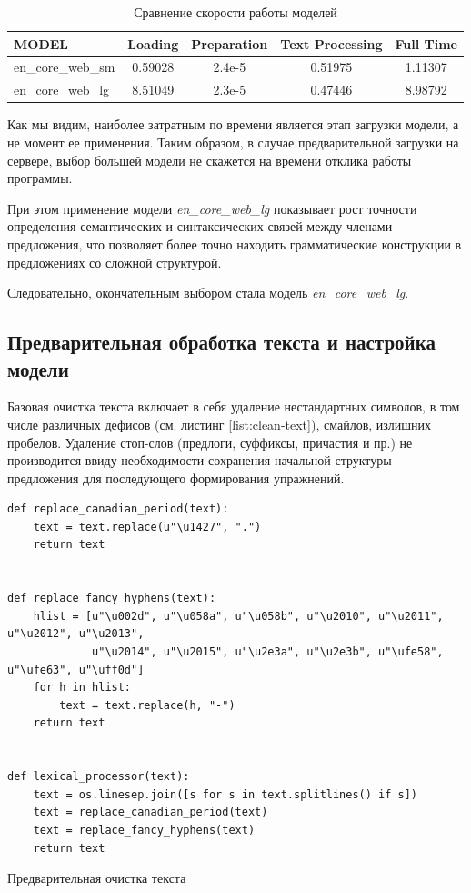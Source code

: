 \begin{table}
\centering
\caption{\label{tab:models-speed}Сравнение скорости работы моделей}
\begin{tabular}{@{}lcccc@{}}
\toprule
MODEL             & Loading & Preparation & Text Processing & Full Time \\ \midrule
en\_core\_web\_sm & 0.59028 & 2.4e-5      & 0.51975         & 1.11307   \\
en\_core\_web\_lg & 8.51049 & 2.3e-5      & 0.47446         & 8.98792   \\ \bottomrule
\end{tabular}
\end{table}

Как мы видим, наиболее затратным по времени является этап загрузки модели, а не момент ее применения. Таким образом, в случае предварительной загрузки на сервере, выбор большей модели не скажется на времени отклика работы программы.

При этом применение модели \emph{en\_core\_web\_lg} показывает рост точности определения семантических и синтаксических связей между членами предложения, что позволяет более точно находить грамматические конструкции в предложениях со сложной структурой. 

Следовательно, окончательным выбором стала модель \emph{en\_core\_web\_lg}.


\subsection{Предварительная обработка текста и настройка модели}
Базовая очистка текста включает в себя удаление нестандартных символов, в том числе различных дефисов (см. листинг \ref{list:clean-text}), смайлов, излишних пробелов. Удаление стоп-слов (предлоги, суффиксы, причастия и пр.) не производится ввиду необходимости сохранения начальной структуры предложения для последующего формирования упражнений.

\begin{ListingEnv}[h]
\begin{lstlisting}
def replace_canadian_period(text):
    text = text.replace(u"\u1427", ".")
    return text


def replace_fancy_hyphens(text):
    hlist = [u"\u002d", u"\u058a", u"\u058b", u"\u2010", u"\u2011", u"\u2012", u"\u2013",
             u"\u2014", u"\u2015", u"\u2e3a", u"\u2e3b", u"\ufe58", u"\ufe63", u"\uff0d"]
    for h in hlist:
        text = text.replace(h, "-")
    return text


def lexical_processor(text):
    text = os.linesep.join([s for s in text.splitlines() if s])
    text = replace_canadian_period(text)
    text = replace_fancy_hyphens(text)
    return text
\end{lstlisting}
\caption{Предварительная очистка текста}
\label{list:clean-text}
\end{ListingEnv}

